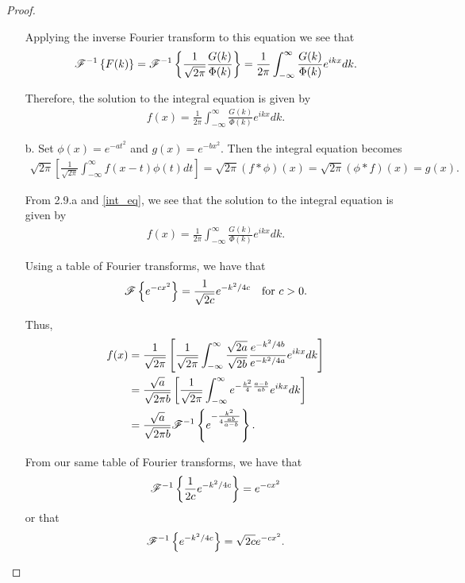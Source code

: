 \begin{proof}
\begin{enumerate}
      Applying the inverse Fourier transform to this equation we see that
      \begin{align*}
        \mathscr{F}^{-1}\left\{ {F(k)} \right\} = \mathscr{F}^{-1}\left\{ {\frac{1}{\sqrt{2\pi}}\frac{G(k)}{\Phi(k)}} \right\}
        = \frac{1}{2\pi} \int_{-\infty}^{\infty}\frac{G(k)}{\Phi(k)}e^{ikx} dk.
      \end{align*}

      Therefore, the solution to the integral equation is given by
      \begin{align}\label{int_eq}
        f(x) = \frac{1}{2\pi} \int_{-\infty}^{\infty}\frac{G(k)}{\Phi(k)}e^{ikx} dk.
      \end{align}

    \item [b.] Set $\phi(x) = e^{-at^2}$ and $g(x) = e^{-bx^2}$. Then
      the integral equation becomes
      \begin{align*}
        \sqrt{2\pi}\left[\frac{1}{\sqrt{2\pi}} \int_{-\infty}^{\infty} f(x-t) \phi(t) dt \right] = \sqrt{2\pi}(f \ast \phi)(x) = \sqrt{2\pi}(\phi \ast f)(x) = g(x).
      \end{align*}

      From 2.9.a and \eqref{int_eq}, we see that the solution to the integral equation is given by
      \begin{align*}
        f(x) = \frac{1}{2\pi} \int_{-\infty}^{\infty}\frac{G(k)}{\Phi(k)}e^{ikx} dk.
      \end{align*}

      Using a table of Fourier transforms, we have that
      \begin{align*}
        \mathscr{F}\left\{ {e^{-cx^2}} \right\} = \frac{1}{\sqrt{2c}} e^{-k^2/4c} \quad \text{for $c > 0$}.
      \end{align*}

      Thus,
      \begin{align*}
        f(x) &= \frac{1}{\sqrt{2\pi}}\left[\frac{1}{\sqrt{2\pi}}\int_{-\infty}^{\infty} \frac{\sqrt{2a}}{\sqrt{2b}}\frac{e^{-k^2/4b}}{e^{-k^2/4a}}e^{ikx}dk\right]\\
        &= \frac{\sqrt{a}}{\sqrt{2\pi b}}\left[ \frac{1}{\sqrt{2\pi}} \int_{-\infty}^{\infty} e^{-\frac{k^2}{4}\frac{a-b}{ab}} e^{ikx} dk\right] \\
        &= \frac{\sqrt{a}}{\sqrt{2\pi b}} \mathscr{F}^{-1}\left\{ {e^{-\frac{k^2}{4\frac{ab}{a-b}}}} \right\}.
      \end{align*}

      From our same table of Fourier transforms, we have that
      \begin{align*}
        \mathscr{F}^{-1}\left\{ {\frac{1}{2c}e^{-k^2/4c}} \right\} = e^{-cx^2}
      \end{align*}
      or that
      \begin{align*}
        \mathscr{F}^{-1}\left\{ {e^{-k^2/4c}} \right\} = \sqrt{2c} e^{-c x^2}.
      \end{align*}


\end{enumerate}
\end{proof}
